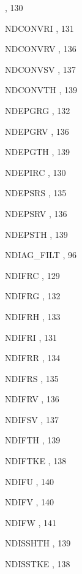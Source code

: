 \begin{theindex}
    \subitem {},  130
  \item NDCONVRI
    \subitem {},  131
  \item NDCONVRV
    \subitem {},  136
  \item NDCONVSV
    \subitem {},  137
  \item NDCONVTH
    \subitem {},  139
  \item NDEPGRG
    \subitem {},  132
  \item NDEPGRV
    \subitem {},  136
  \item NDEPGTH
    \subitem {},  139
  \item NDEPIRC
    \subitem {},  130
  \item NDEPSRS
    \subitem {},  135
  \item NDEPSRV
    \subitem {},  136
  \item NDEPSTH
    \subitem {},  139
  \item NDIAG\_FILT
    \subitem {},  96
  \item NDIFRC
    \subitem {},  129
  \item NDIFRG
    \subitem {},  132
  \item NDIFRH
    \subitem {},  133
  \item NDIFRI
    \subitem {},  131
  \item NDIFRR
    \subitem {},  134
  \item NDIFRS
    \subitem {},  135
  \item NDIFRV
    \subitem {},  136
  \item NDIFSV
    \subitem {},  137
  \item NDIFTH
    \subitem {},  139
  \item NDIFTKE
    \subitem {},  138
  \item NDIFU
    \subitem {},  140
  \item NDIFV
    \subitem {},  140
  \item NDIFW
    \subitem {},  141
  \item NDISSHTH
    \subitem {},  139
  \item NDISSTKE
    \subitem {},  138

\end{theindex}
